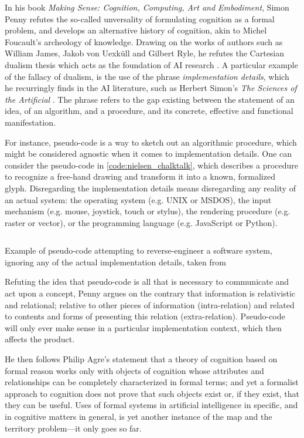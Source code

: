 In his book \emph{Making Sense: Cognition, Computing, Art and Embodiment}, Simon Penny refutes the so-called unversality of formulating cognition as a formal problem, and develops an alternative history of cognition, akin to Michel Foucault's archeology of knowledge. Drawing on the works of authors such as William James, Jakob von Uexküll and Gilbert Ryle, he refutes the Cartesian dualism thesis which acts as the foundation of AI research \citep{penny_making_2019}. A particular example of the fallacy of dualism, is the use of the phrase \emph{implementation details}, which he recurringly finds in the AI literature, such as Herbert Simon's \emph{The Sciences of the Artificial} \citep{simon_sciences_1996}. The phrase refers to the gap existing between the statement of an idea, of an algorithm, and a procedure, and its concrete, effective and functional manifestation.

For instance, pseudo-code is a way to sketch out an algorithmic procedure, which might be considered agnostic when it comes to implementation details. One can consider the pseudo-code in \ref{code:nielsen_chalktalk}, which describes a procedure to recognize a free-hand drawing and transform it into a known, formalized glyph. Disregarding the implementation details means disregarding any reality of an actual system: the operating system (e.g. UNIX or MSDOS), the input mechanism (e.g. mouse, joystick, touch or stylus), the rendering procedure (e.g. raster or vector), or the programming language (e.g. JavaScript or Python).

\begin{listing}
    \inputminted{text}{./corpus/pseudocode.txt}
    \caption{Example of pseudo-code attempting to reverse-engineer a software system, ignoring any of the actual implementation details, taken from \citep{nielsen_working_2017}}
    \label{code:nielsen_chalktalk}
\end{listing}

Refuting the idea that pseudo-code is all that is necessary to communicate and act upon a concept, Penny  argues on the contrary that information is relativistic and relational; relative to other pieces of information (intra-relation) and related to contents and forms of presenting this relation (extra-relation). Pseudo-code will only ever make sense in a particular implementation context, which then affects the product.

He then follows Philip Agre's statement that a theory of cognition based on formal reason works only with objects of cognition whose attributes and relationships can be completely characterized in formal terms; and yet a formalist approach to cognition does not prove that such objects exist or, if they exist, that they can be useful. Uses of formal systems in artificial intelligence in specific, and in cognitive matters in general, is yet another instance of the map and the territory problem—it only goes so far.

